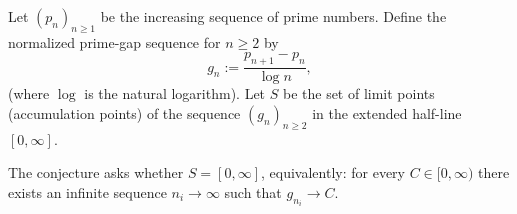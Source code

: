 Let $(p_n)_{n\ge 1}$ be the increasing sequence of prime numbers. Define the normalized prime-gap sequence for $n\ge 2$ by
\[
 g_n := \frac{p_{n+1}-p_n}{\log n},
\]
(where $\log$ is the natural logarithm). Let $S$ be the set of limit points (accumulation points) of the sequence $(g_n)_{n\ge 2}$ in the extended half-line $[0,\infty]$.

The conjecture asks whether $S=[0,\infty]$, equivalently: for every $C\in[0,\infty)$ there exists an infinite sequence $n_i\to\infty$ such that $g_{n_i}\to C$.
